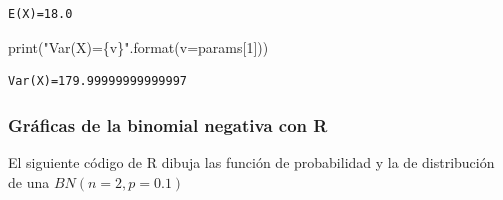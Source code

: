 \documentclass[
  letterpaper,
  DIV=11,
  numbers=noendperiod]{scrreprt}
\newenvironment{Shaded}{\begin{snugshade}}{\end{snugshade}}
\newcommand{\BuiltInTok}[1]{\textcolor[rgb]{0.00,0.23,0.31}{#1}}
\newcommand{\DecValTok}[1]{\textcolor[rgb]{0.68,0.00,0.00}{#1}}
\newcommand{\NormalTok}[1]{\textcolor[rgb]{0.00,0.23,0.31}{#1}}
\newcommand{\OperatorTok}[1]{\textcolor[rgb]{0.37,0.37,0.37}{#1}}
\newcommand{\SpecialCharTok}[1]{\textcolor[rgb]{0.37,0.37,0.37}{#1}}
\newcommand{\StringTok}[1]{\textcolor[rgb]{0.13,0.47,0.30}{#1}}
\begin{document}
\begin{verbatim}
E(X)=18.0
\end{verbatim}

\begin{Shaded}
\begin{Highlighting}[]
\BuiltInTok{print}\NormalTok{(}\StringTok{"Var(X)=}\SpecialCharTok{\{v\}}\StringTok{"}\NormalTok{.}\BuiltInTok{format}\NormalTok{(v}\OperatorTok{=}\NormalTok{params[}\DecValTok{1}\NormalTok{]))}
\end{Highlighting}
\end{Shaded}

\begin{verbatim}
Var(X)=179.99999999999997
\end{verbatim}

\subsubsection{Gráficas de la binomial negativa con
R}\label{gruxe1ficas-de-la-binomial-negativa-con-r}

El siguiente código de R dibuja las función de probabilidad y la de
distribución de una \(BN(n=2,p=0.1)\)
\end{document}
